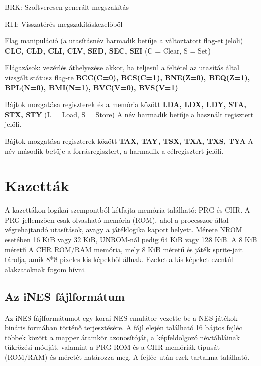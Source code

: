 \begin{compactdesc}
\begin{compactdesc}
		\item[BRK:] Szoftveresen generált megszakítás
		\item[RTI:] Visszatérés megszakításkezelőből
	\end{compactdesc}
	\item Flag manipuláció (a utasításnév harmadik betűje a változtatott flag-et jelöli) \newline \textbf{CLC, CLD, CLI, CLV, SED, SEC, SEI}
	\newline
	(C = Clear, S = Set)
	\item Elágazások: vezérlés áthelyezése akkor, ha teljesül a feltétel az utasítás által vizsgált státusz flag-re
	\newline \textbf{BCC(C=0), BCS(C=1), BNE(Z=0), BEQ(Z=1), BPL(N=0), BMI(N=1),  BVC(V=0), BVS(V=1)}
	\item Bájtok mozgatása regiszterek és a memória között
	\newline
	\textbf{LDA, LDX, LDY, STA, STX, STY} 
	\newline
	(L = Load, S = Store)
	\newline
	A név harmadik betűje a használt regisztert jelöli.
	\item Bájtok mozgatása regiszterek között
	\newline
	\textbf{TAX, TAY, TSX, TXA, TXS, TYA}
	\newline
	A név második betűje a forrásregisztert, a harmadik a célregisztert jelöli.
\end{compactdesc}

\section{Kazetták}

A kazettákon logikai szempontból kétfajta memória található: PRG és CHR.
A PRG jellemzően csak olvasható memória (ROM), ahol a processzor által végrehajtandó utasítások, avagy a játéklogika kapott helyett. Mérete NROM esetében 16 KiB vagy 32 KiB, UNROM-nál pedig 64 KiB vagy 128 KiB. A 8 KiB méretű A CHR ROM/RAM memória, mely 8 KiB méretű és játék sprite-jait tárolja, amik 8*8 pixeles kis képekből állnak. Ezeket a kis képeket ezentúl alakzatoknak fogom hívni. 

\subsection{Az iNES fájlformátum}

Az iNES fájlformátumot egy korai NES emulátor vezette be a NES játékok bináris formában történő terjesztésére. A fájl elején található 16 bájtos fejléc többek között a mapper áramkör azonosítóját, a képfeldolgozó névtábláinak tükrözési módját, valamint a PRG ROM és a CHR memóriák típusát (ROM/RAM) és méretét határozza meg. A fejléc után ezek tartalma található.

